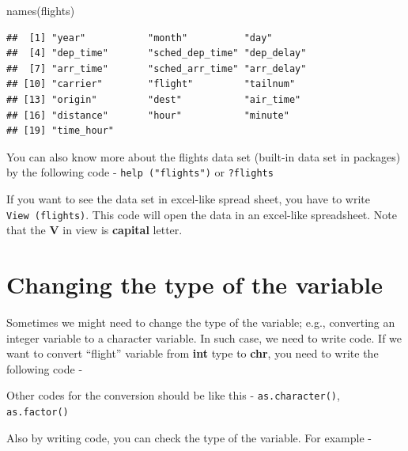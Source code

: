 \documentclass[
]{book}
\newenvironment{Shaded}{\begin{snugshade}}{\end{snugshade}}
\newcommand{\FunctionTok}[1]{\textcolor[rgb]{0.00,0.00,0.00}{#1}}
\newcommand{\NormalTok}[1]{#1}
\newcommand{\OtherTok}[1]{\textcolor[rgb]{0.56,0.35,0.01}{#1}}
\newcommand{\SpecialCharTok}[1]{\textcolor[rgb]{0.00,0.00,0.00}{#1}}
\begin{document}
\begin{Shaded}
\begin{Highlighting}[]
\FunctionTok{names}\NormalTok{(flights)}
\end{Highlighting}
\end{Shaded}

\begin{verbatim}
##  [1] "year"           "month"          "day"           
##  [4] "dep_time"       "sched_dep_time" "dep_delay"     
##  [7] "arr_time"       "sched_arr_time" "arr_delay"     
## [10] "carrier"        "flight"         "tailnum"       
## [13] "origin"         "dest"           "air_time"      
## [16] "distance"       "hour"           "minute"        
## [19] "time_hour"
\end{verbatim}

You can also know more about the flights data set (built-in data set in packages) by the following code - \texttt{help\ ("flights")} or \texttt{?flights}

If you want to see the data set in excel-like spread sheet, you have to write \texttt{View\ (flights)}. This code will open the data in an excel-like spreadsheet. Note that the \textbf{V} in view is \textbf{capital} letter.

\hypertarget{changing-the-type-of-the-variable}{%
\section{Changing the type of the variable}\label{changing-the-type-of-the-variable}}

Sometimes we might need to change the type of the variable; e.g., converting an integer variable to a character variable. In such case, we need to write code. If we want to convert ``flight'' variable from \textbf{int} type to \textbf{chr}, you need to write the following code -

\begin{Shaded}
\end{Shaded}

Other codes for the conversion should be like this - \texttt{as.character()}, \texttt{as.factor()}

Also by writing code, you can check the type of the variable. For example -
\end{document}
